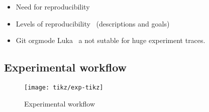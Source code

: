 \begin{itemize}
    \item  Need for reproducibility
    \item Levels of reproducibility~\cite{Feitelson15From} (descriptions and
        goals)
    \item Git orgmode Luka~\cite{Stanisic15Reproducible} a not sutable for
        huge experiment traces.
\end{itemize}


\subsection{Experimental workflow}

\begin{figure}[htb]
    \centering
    \texttt{[image: tikz/exp-tikz]}
    \caption{Experimental workflow}
    \label{fig:exp}
\end{figure}

